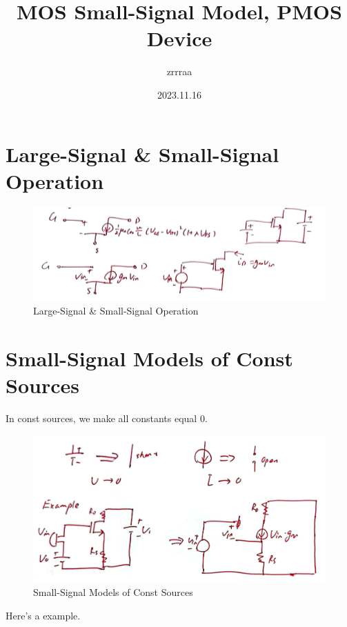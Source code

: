 \documentclass[fontset=windows]{article}
\title{\heiti\zihao{2} MOS Small-Signal Model, PMOS Device}
\author{\songti zrrraa}
\date{2023.11.16}
\begin{document}
\maketitle
\thispagestyle{empty}

\section*{Large-Signal \& Small-Signal Operation}

\begin{figure}[htbp]
    \centering
    \includegraphics[scale=0.6]{1.jpg}
    \captionsetup{labelformat=empty}
    \caption{Large-Signal \& Small-Signal Operation}
    \label{1}
\end{figure}

\section*{Small-Signal Models of Const Sources}

In const sources, we make all constants equal 0. 

\begin{figure}[htbp]
    \centering
    \includegraphics[scale=0.6]{2.jpg}
    \captionsetup{labelformat=empty}
    \caption{Small-Signal Models of Const Sources}
    \label{2}
\end{figure}

Here's a example. 
\end{document}
